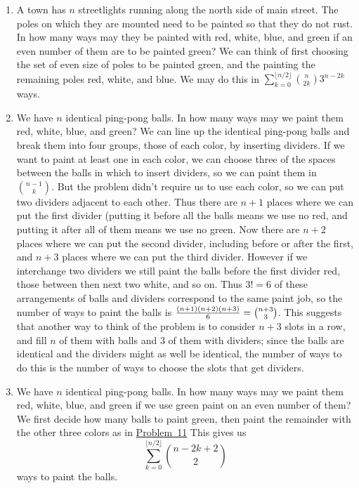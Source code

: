 \documentclass[10pt,]{book}
\theoremstyle{plain}
\theoremstyle{definition}
\numberwithin{equation}{chapter}
\begin{document}
\begin{enumerate}
%
\item\hypertarget{li-18}{}A town has \(n\) streetlights running along the north side of main street.  The poles on which they are mounted need to be painted so that they do not rust.  In how many ways may they be painted with red, white, blue, and green if an even number of them are to be painted green? We can think of first choosing the set of even size of poles to be painted green, and the painting the remaining poles red, white, and blue. We may do this in \(\sum_{k=0}^{\lfloor n/2\rfloor}{n\choose 2k}3^{n-2k}\) ways.%
%
\item\hypertarget{pingpongpaint}{}We have \(n\) identical ping-pong balls.  In how many ways may we paint them red, white, blue, and green? We can line up the identical ping-pong balls and break them into four groups, those of each color, by inserting dividers. If we want to paint at least one in each color, we can choose three of the spaces between the balls in which to insert dividers, so we can paint them in \(n-1\choose k\). But the problem didn't require us to use each color, so we can put two dividers adjacent to each other. Thus there are \(n+1\) places where we can put the first divider (putting it before all the balls means we use no red, and putting it after all of them means we use no green. Now there are \(n+2\) places where we can put the second divider, including before or after the first, and \(n+3\) places where we can put the third divider. However if we interchange two dividers we still paint the balls before the first divider red, those between then next two white, and so on. Thus \(3!=6\) of these arrangements of balls and dividers correspond to the same paint job, so the number of ways to paint the balls is \({(n+1)(n+2)(n+3)\over6} ={n+3\choose
3}\). This suggests that another way to think of the problem is to consider \(n+3\) slots in a row, and fill \(n\) of them with balls and \(3\) of them with dividers; since the balls are identical and the dividers might as well be identical, the number of ways to do this is the number of ways to choose the slots that get dividers.%
%
\item\hypertarget{li-20}{}We have \(n\) identical ping-pong balls.  In how many ways may we paint them red, white, blue, and green if we use green paint on an even number of them? We first decide how many balls to paint green, then paint the remainder with the other three colors as in \hyperlink{pingpongpaint}{Problem~11} This gives us%
\begin{equation*}
\sum_{k=0}^{\lfloor n/2\rfloor}{n-2k+2\choose 2}
\end{equation*}
ways to paint the balls.%
%
\end{enumerate}
%
%
%
\appendix
%
\typeout{************************************************}
\typeout{************************************************}
\end{document}
